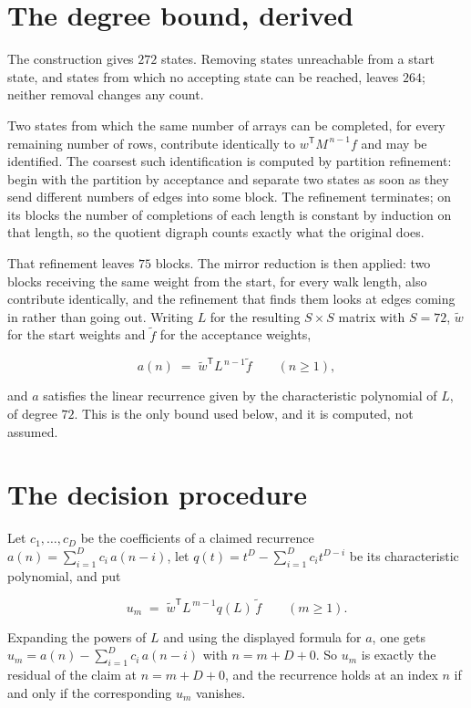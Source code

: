 \documentclass[11pt]{article}
\theoremstyle{definition}
\begin{document}
\section{The degree bound, derived}

The construction gives $272$ states. Removing states unreachable from a start state, and states from which no accepting state can be reached, leaves $264$; neither removal changes any count.

Two states from which the same number of arrays can be completed, for every remaining number of rows, contribute identically to $w^{\mathsf T}M^{\,n-1}f$ and may be identified. The coarsest such identification is computed by partition refinement: begin with the partition by acceptance and separate two states as soon as they send different numbers of edges into some block. The refinement terminates; on its blocks the number of completions of each length is constant by induction on that length, so the quotient digraph counts exactly what the original does.

That refinement leaves $75$ blocks. The mirror reduction is then applied: two blocks receiving the same weight from the start, for every walk length, also contribute identically, and the refinement that finds them looks at edges coming in rather than going out. Writing $L$ for the resulting $S \times S$ matrix with $S = 72$, $\tilde w$ for the start weights and $\tilde f$ for the acceptance weights,

\[a(n) \;=\; \tilde w^{\mathsf T} L^{\,n-1} \tilde f \qquad (n \ge 1),\]

and $a$ satisfies the linear recurrence given by the characteristic polynomial of $L$, of degree $72$. This is the only bound used below, and it is computed, not assumed.

\section{The decision procedure}

Let $c_1,\dots,c_D$ be the coefficients of a claimed recurrence $a(n) = \sum_{i=1}^{D} c_i\,a(n-i)$, let $q(t) = t^{D} - \sum_{i=1}^{D} c_i t^{D-i}$ be its characteristic polynomial, and put

\[u_m \;=\; \tilde w^{\mathsf T} L^{\,m-1} q(L)\,\tilde f \qquad (m \ge 1).\]

Expanding the powers of $L$ and using the displayed formula for $a$, one gets $u_m = a(n) - \sum_{i=1}^{D} c_i\,a(n-i)$ with $n = m + D + 0$. So $u_m$ is exactly the residual of the claim at $n = m + D + 0$, and the recurrence holds at an index $n$ if and only if the corresponding $u_m$ vanishes.
\end{document}
